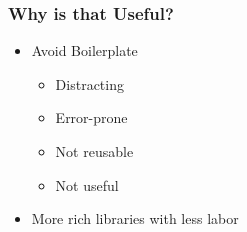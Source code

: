 \documentclass[t,12pt,numbers,fleqn,usenames,xcolor=dvipsnames]{beamer}
\begin{document}
\begin{frame}
\frametitle{Why is that Useful?}
\pause
\begin{itemize}
\item Avoid Boilerplate 
\begin{itemize}
	\item Distracting
	\item Error-prone 
	\item Not reusable 
	\item Not useful 
\end{itemize}
\pause
\item More rich libraries with less labor
\end{itemize}
\end{frame}

\end{document}
